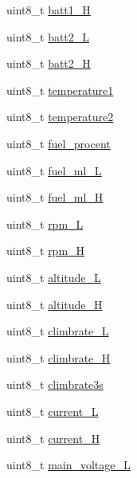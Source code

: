 \begin{DoxyCompactItemize}
\item 
uint8\+\_\+t \hyperlink{structHOTT__GAM__MSG__s_a179a6a695a2f1a0a11842fb4289710c8}{batt1\+\_\+\+H}
\item 
uint8\+\_\+t \hyperlink{structHOTT__GAM__MSG__s_a4deaae14dfb236242b3c19d2ddb3c0b6}{batt2\+\_\+\+L}
\item 
uint8\+\_\+t \hyperlink{structHOTT__GAM__MSG__s_a4d7f5e3a0c7f3061aa87c8705ce77c22}{batt2\+\_\+\+H}
\item 
uint8\+\_\+t \hyperlink{structHOTT__GAM__MSG__s_ab16ec09f213e4dd719048a972fefa8ee}{temperature1}
\item 
uint8\+\_\+t \hyperlink{structHOTT__GAM__MSG__s_ae72237e6410df90fe73670194c78ace7}{temperature2}
\item 
uint8\+\_\+t \hyperlink{structHOTT__GAM__MSG__s_afdbf9412ef9b2ee9c4ff32f7c08c5e4d}{fuel\+\_\+procent}
\item 
uint8\+\_\+t \hyperlink{structHOTT__GAM__MSG__s_a5727e9828c8e47fd97f358d787c9f558}{fuel\+\_\+ml\+\_\+\+L}
\item 
uint8\+\_\+t \hyperlink{structHOTT__GAM__MSG__s_accb025b915b2da2e6644f66d0b332e51}{fuel\+\_\+ml\+\_\+\+H}
\item 
uint8\+\_\+t \hyperlink{structHOTT__GAM__MSG__s_aba33813756f435df950a82c26c9aea3d}{rpm\+\_\+\+L}
\item 
uint8\+\_\+t \hyperlink{structHOTT__GAM__MSG__s_a998444f71b8ba27ca1a068c39e71abc3}{rpm\+\_\+\+H}
\item 
uint8\+\_\+t \hyperlink{structHOTT__GAM__MSG__s_a9f819a15bbf01dddb337afa9c3656bc3}{altitude\+\_\+\+L}
\item 
uint8\+\_\+t \hyperlink{structHOTT__GAM__MSG__s_ab61647067fb141182cb19e49e6cd33e6}{altitude\+\_\+\+H}
\item 
uint8\+\_\+t \hyperlink{structHOTT__GAM__MSG__s_aa78bf8ba86b54af437a336bc37c19d29}{climbrate\+\_\+\+L}
\item 
uint8\+\_\+t \hyperlink{structHOTT__GAM__MSG__s_a4dbbbc9eb8cd06859deea9d758d8e509}{climbrate\+\_\+\+H}
\item 
uint8\+\_\+t \hyperlink{structHOTT__GAM__MSG__s_a1f513820ca945da4fe62cf763cfd306a}{climbrate3s}
\item 
uint8\+\_\+t \hyperlink{structHOTT__GAM__MSG__s_aa19de479c6a4919f6ff397937ce3ddcc}{current\+\_\+\+L}
\item 
uint8\+\_\+t \hyperlink{structHOTT__GAM__MSG__s_afda2246d619524371a70b73935efceef}{current\+\_\+\+H}
\item 
uint8\+\_\+t \hyperlink{structHOTT__GAM__MSG__s_a300114269c095f502ac9b607a7e50eb3}{main\+\_\+voltage\+\_\+\+L}

\end{DoxyCompactItemize}
